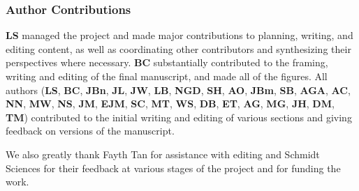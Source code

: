 \documentclass[10pt]{article} %
\begin{document}
\subsubsection*{Author Contributions}
\textbf{LS} managed the project and made major contributions to planning, writing, and editing content, as well as coordinating other contributors and synthesizing their perspectives where necessary. \textbf{BC} substantially contributed to the framing, writing and editing of the final manuscript, and made all of the figures. All authors (\textbf{LS}, \textbf{BC}, \textbf{JBn}, \textbf{JL}, \textbf{JW}, \textbf{LB}, \textbf{NGD}, \textbf{SH}, \textbf{AO}, \textbf{JBm}, \textbf{SB}, \textbf{AGA}, \textbf{AC}, \textbf{NN}, \textbf{MW}, \textbf{NS}, \textbf{JM}, \textbf{EJM}, \textbf{SC}, \textbf{MT}, \textbf{WS}, \textbf{DB}, \textbf{ET}, \textbf{AG}, \textbf{MG}, \textbf{JH}, \textbf{DM}, \textbf{TM}) contributed to the initial writing and editing of various sections and giving feedback on versions of the manuscript.


We also greatly thank Fayth Tan for assistance with editing and Schmidt Sciences for their feedback at various stages of the project and for funding the work.





\appendix

\end{document}
